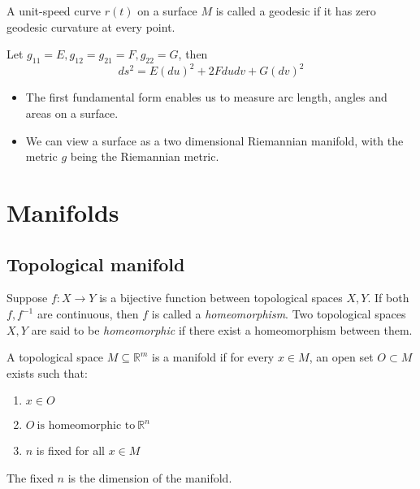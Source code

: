 \begin{refsection}
\begin{definition}\cite[147]{krim2015geometric}
A unit-speed curve $r(t)$ on a surface $M$ is called a geodesic if it has zero geodesic curvature at every point.
\end{definition}

\begin{definition}
Let $g_{11} = E, g_{12} = g_{21} = F, g_{22} = G$, then
$$ds^2 = E(du)^2 + 2Fdudv + G(dv)^2$$
\end{definition}

\begin{remark}[implications]\hfill
\begin{itemize}
    \item The first fundamental form enables us to measure arc length, angles and areas on a surface.
    \item We can view a surface as a two dimensional Riemannian manifold, with the metric $g$ being the Riemannian metric.
\end{itemize}
\end{remark}


\begin{definition}

\end{definition}


\section{Manifolds}
\subsection{Topological manifold}
 \begin{definition}[homemorphism]
	Suppose $f: X\rightarrow Y$ is a bijective function between topological spaces $X,Y$. If both $f,f^{-1}$ are continuous, then $f$ is called a \emph{homeomorphism}. Two topological spaces $X,Y$ are said to be \emph{homeomorphic} if there exist a homeomorphism between them.
\end{definition}

\begin{definition}
A topological space $M \subseteq \mathbb{R}^m$ is a manifold if for every $x \in M$, an open set $O \subset M$ exists such that:
\begin{enumerate}
	\item $x \in O$
	\item $O ~\text{is homeomorphic to}~ \mathbb{R}^n$
	\item $n$ is fixed for all $x \in M$
\end{enumerate}
The fixed $n$ is the dimension of the manifold.	
\end{definition}



\end{refsection}
